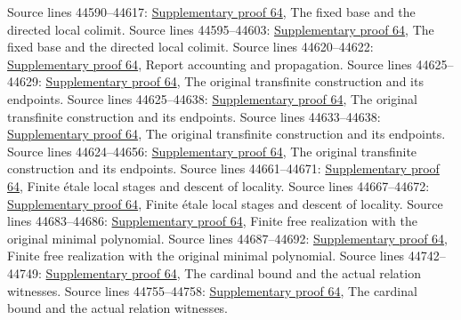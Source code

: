\begin{AlgebraSourceRoutes}
 Source lines 44590--44617: \hyperlink{algebra_construct_flat_notes_20260929}{Supplementary proof 64}, The fixed base and the directed local colimit.
 Source lines 44595--44603: \hyperlink{algebra_construct_flat_notes_20260929}{Supplementary proof 64}, The fixed base and the directed local colimit.
 Source lines 44620--44622: \hyperlink{algebra_construct_flat_notes_20260929}{Supplementary proof 64}, Report accounting and propagation.
 Source lines 44625--44629: \hyperlink{algebra_construct_flat_notes_20260929}{Supplementary proof 64}, The original transfinite construction and its endpoints.
 Source lines 44625--44638: \hyperlink{algebra_construct_flat_notes_20260929}{Supplementary proof 64}, The original transfinite construction and its endpoints.
 Source lines 44633--44638: \hyperlink{algebra_construct_flat_notes_20260929}{Supplementary proof 64}, The original transfinite construction and its endpoints.
 Source lines 44624--44656: \hyperlink{algebra_construct_flat_notes_20260929}{Supplementary proof 64}, The original transfinite construction and its endpoints.
 Source lines 44661--44671: \hyperlink{algebra_construct_flat_notes_20260929}{Supplementary proof 64}, Finite étale local stages and descent of locality.
 Source lines 44667--44672: \hyperlink{algebra_construct_flat_notes_20260929}{Supplementary proof 64}, Finite étale local stages and descent of locality.
 Source lines 44683--44686: \hyperlink{algebra_construct_flat_notes_20260929}{Supplementary proof 64}, Finite free realization with the original minimal polynomial.
 Source lines 44687--44692: \hyperlink{algebra_construct_flat_notes_20260929}{Supplementary proof 64}, Finite free realization with the original minimal polynomial.
 Source lines 44742--44749: \hyperlink{algebra_construct_flat_notes_20260929}{Supplementary proof 64}, The cardinal bound and the actual relation witnesses.
 Source lines 44755--44758: \hyperlink{algebra_construct_flat_notes_20260929}{Supplementary proof 64}, The cardinal bound and the actual relation witnesses.
\end{AlgebraSourceRoutes}

